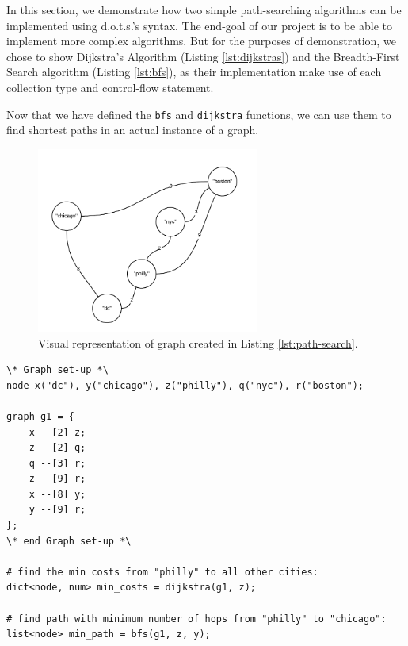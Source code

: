 \documentclass{article}
\newcommand{\pltlang}{d.o.t.s.} %
\newcommand{\code}[1]{\texttt{#1}} %
\begin{document}
In this section, we demonstrate how two simple path-searching algorithms can be implemented using \pltlang's syntax. The end-goal of our project is to be able to implement more complex algorithms. But for the purposes of demonstration, we chose to show Dijkstra's Algorithm (Listing \ref{lst:dijkstras}) and the Breadth-First Search algorithm (Listing \ref{lst:bfs}), as their implementation make use of each collection type and control-flow statement. 






Now that we have defined the \code{bfs} and \code{dijkstra} functions, we can use them to find shortest paths in an actual instance of a graph.

\begin{figure}[H]
\centering
\includegraphics[width=0.65\textwidth]{graphs/example_city_graph.png}
\caption{Visual representation of graph created in Listing \ref{lst:path-search}.}
\label{fig:node_ops}
\end{figure}


\begin{lstlisting}[language=pltLang, caption=Using user-defined functions., label=lst:path-search]
\* Graph set-up *\
node x("dc"), y("chicago"), z("philly"), q("nyc"), r("boston");

graph g1 = {
    x --[2] z;
    z --[2] q;
    q --[3] r;
    z --[9] r;
    x --[8] y;
    y --[9] r;
};
\* end Graph set-up *\

# find the min costs from "philly" to all other cities:
dict<node, num> min_costs = dijkstra(g1, z);

# find path with minimum number of hops from "philly" to "chicago":
list<node> min_path = bfs(g1, z, y);


\end{lstlisting}
\end{document}
